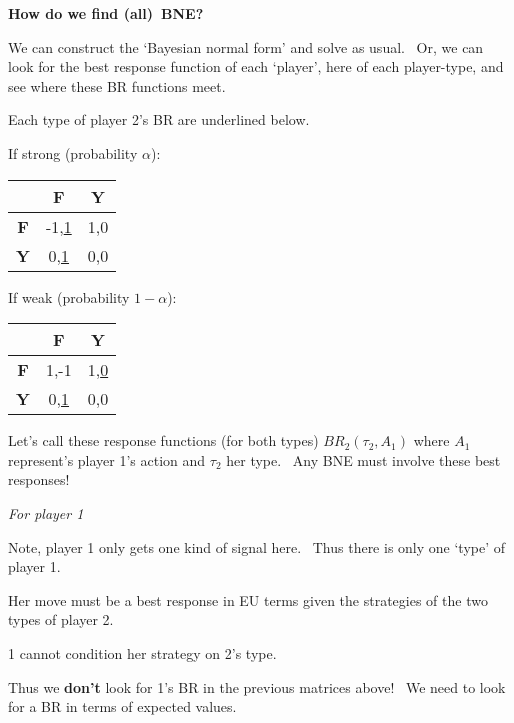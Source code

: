 \documentclass[handout]{beamer}
\begin{document}
\begin{frame}%

\textbf{How do we find (all)\ BNE?}

We can construct the `Bayesian normal form' and solve as usual. \ Or, we can
look for the best response function of each `player', here of each
player-type, and see where these BR functions meet.\medskip

\pause%
Each type of player 2's BR are underlined below.\medskip

If strong (probability $\alpha $): 
\begin{tabular}{|c|c|c|}
\hline
& \textbf{F} & \textbf{Y} \\ \hline
\textbf{F} & -1,\underline{1} & 1,0 \\ \hline
\textbf{Y} & 0,\underline{1} & 0,0 \\ \hline
\end{tabular}

\medskip

If weak (probability $1-\alpha $): 
\begin{tabular}{|c|c|c|}
\hline
& \textbf{F} & \textbf{Y} \\ \hline
\textbf{F} & 1,-1 & 1,\underline{0} \\ \hline
\textbf{Y} & 0,\underline{1} & 0,0 \\ \hline
\end{tabular}%
\textbf{\medskip }

Let's call these response functions (for both types) $BR_{2}(\tau _{2},A_{1})
$ where $A_{1}$ represent's player 1's action and $\tau _{2}$ her type. \
Any BNE must involve these best responses!

\end{frame}%

\begin{frame}%

\textit{For player 1}

{\footnotesize Note, player 1 only gets one kind of signal here. \ Thus
there is only one `type' of player 1.}\bigskip

{\footnotesize Her move must be a best response in EU terms given the
strategies of the two types of player 2.}

{\footnotesize 1 cannot condition her strategy on 2's type.}\bigskip

{\footnotesize Thus we \textbf{don't} look for 1's BR in the previous
matrices above! \ We need to look for a BR in terms of expected values.}

\end{frame}%
\end{document}
